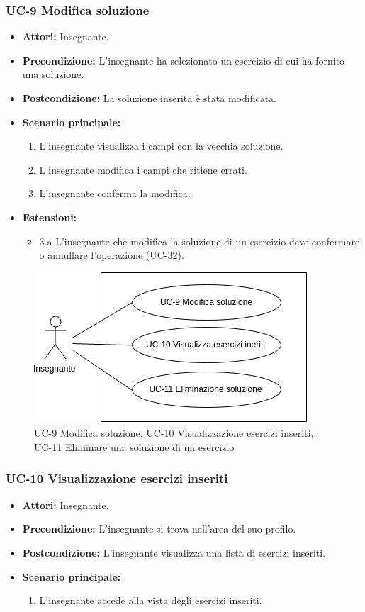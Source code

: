 \subsubsection{UC-9 Modifica soluzione}
\begin{itemize}
\item \textbf{Attori:} Insegnante.
\item \textbf{Precondizione:} L'insegnante ha selezionato un esercizio di cui ha fornito una soluzione.
\item \textbf{Postcondizione:} La soluzione inserita è stata modificata.
\item \textbf{Scenario principale:}
		\begin{enumerate}
		\item L'insegnante visualizza i campi con la vecchia soluzione.
		\item L'insegnante modifica i campi che ritiene errati.
		\item L'insegnante conferma la modifica.
		\end{enumerate}
	\item \textbf{Estensioni:}
	\begin{itemize}
	\item 3.a L'insegnante che modifica la soluzione di un esercizio deve confermare o annullare l'operazione (UC-32).
	\end{itemize}
\end{itemize}
\begin{figure}[h]
	\centering
	\includegraphics[scale=0.7]{images/UC-9.png}
	\caption{UC-9 Modifica soluzione, UC-10 Visualizzazione esercizi inseriti, UC-11 Eliminare una soluzione di un esercizio}
\end{figure}

\subsubsection{UC-10 Visualizzazione esercizi inseriti}
\begin{itemize}
\item \textbf{Attori: }Insegnante.
		\item \textbf{Precondizione: }L'insegnante si trova nell'area del suo profilo.
		\item \textbf{Postcondizione: }L'insegnante visualizza una lista di esercizi inseriti. 
		\item \textbf{Scenario principale: }
		\begin{enumerate}
		\item L'insegnante accede alla vista degli esercizi inseriti.
		\end{enumerate}
	\end{itemize}
	
